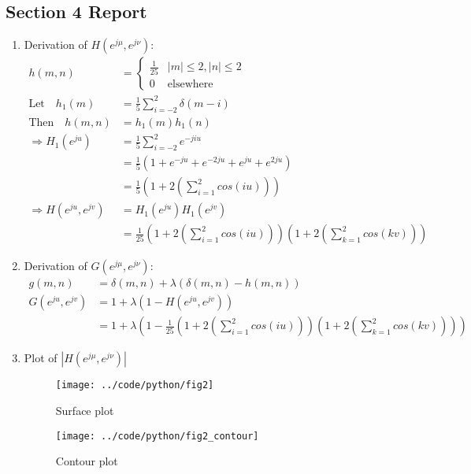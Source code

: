 \documentclass[a4paper,11pt]{article}
\begin{document}
%
\clearpage
\vspace{2ex}
%
\subsection*{Section 4 Report} 
\begin{enumerate}
\item Derivation of $H(e^{j\mu},e^{j\nu})$:
\begin{align*}
 h(m,n) &= 
 \begin{cases}
 \frac{1}{25} & |m|\leq 2, |n|\leq 2\\
 0 & \text{elsewhere}
 \end{cases}\\
 \text{Let}\quad h_1(m) &= \frac{1}{5}\sum_{i=-2}^2 \delta(m-i)\\
 \text{Then}\quad h(m,n)&=h_1(m)h_1(n)\\
 \Rightarrow H_1(e^{ju}) &= \frac{1}{5}\sum_{i=-2}^2 e^{-jiu}\\
 &= \frac{1}{5} (1+ e^{-ju} + e^{-2ju}+  e^{ju} + e^{2ju})\\
 &= \frac{1}{5}(1+ 2(\sum_{i=1}^{2}cos(iu)) )\\
 \Rightarrow H(e^{ju},e^{jv}) &= H_1(e^{ju}) H_1(e^{jv})\\
 &= \frac{1}{25}(1+ 2(\sum_{i=1}^{2}cos(iu)))(1+ 2(\sum_{k=1}^{2}cos(kv)) )
\end{align*}

\item Derivation of $G(e^{j\mu},e^{j\nu})$:
\begin{align*}
 g(m,n)&=\delta(m,n) +\lambda(\delta(m,n)-h(m,n))\\
 G(e^{ju},e^{jv}) &= 1 + \lambda(1-H(e^{ju},e^{jv}))\\
 &= 1+ \lambda(1- \frac{1}{25}(1+ 2(\sum_{i=1}^{2}cos(iu)))(1+ 2(\sum_{k=1}^{2}cos(kv)) ) )
\end{align*}



\newpage
\item Plot of $|H(e^{j\mu},e^{j\nu})|$
\begin{figure}[!hp]
 \centering
 \texttt{[image: ../code/python/fig2]}
 \caption{Surface plot}
\end{figure}

\begin{figure}[!hp]
 \centering
 \texttt{[image: ../code/python/fig2\_contour]}
 \caption{Contour plot}
\end{figure}


\end{enumerate}
\end{document}
